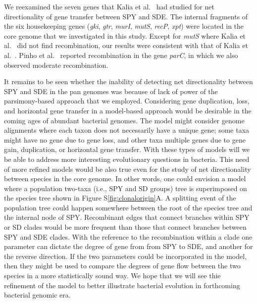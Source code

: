 \documentclass[10pt]{article}
\let\citet\cite
\begin{document}
We reexamined the seven genes that Kalia et al.\ \citet{Kalia2001} had studied for net
directionality of gene transfer between SPY and SDE.  The internal fragments of
the six housekeeping genes (\textit{gki}, \textit{gtr}, \textit{murI},
\textit{mutS}, \textit{recP}, \textit{xpt}) were located in the core genome that
we investigated in this study.  Except for \textit{mutS} where Kalia et al.\ \citet{Kalia2001}
did not find recombination, our results were consistent with that of
Kalia et al.\ \citet{Kalia2001}.  Pinho et al.\ \citet{Pinho2010} reported recombination in the gene
\textit{parC}, in which we also observed moderate recombination.

It remains to be seen whether the inability of detecting net directionality
between SPY and SDE in the pan genomes was because of lack of power of the
parsimony-based approach that we employed. Considering gene duplication, loss,
and horizontal gene transfer in a model-based approach would be desirable in the
coming ages of abundant bacterial genomes. The model might consider genome
alignments where each taxon does not necessarily have a unique gene; some taxa
might have no gene due to gene loss, and other taxa multiple genes due to gene
gain, duplication, or horizontal gene transfer. With these types of models will
we be able to address more interesting evolutionary questions in bacteria. This
need of more refined models would be also true even for the study of net
directionality between species in the core genome.  In other words, one could
envision a model where a population two-taxa (i.e., SPY and SD groups) tree is
superimposed on the species tree shown in Figure S\ref{fig:clonalorigin}A. A
splitting event of the population tree could happen somewhere between the root
of the species tree and the internal node of SPY. Recombinant edges that connect
branches within SPY or SD clades would be more frequent than those that connect
branches between SPY and SDE clades.  With the reference to the recombination
within a clade one parameter can dictate the degree of gene from from SPY to
SDE, and another for the reverse direction.  If the two parameters could be
incorporated in the model, then they might be used to compare the degrees of
gene flow between the two species in a more statistically sound way.  We hope
that we will see thie refinement of the model to better illustrate bacterial
evolution in forthcoming bacterial genomic era.

\end{document}
